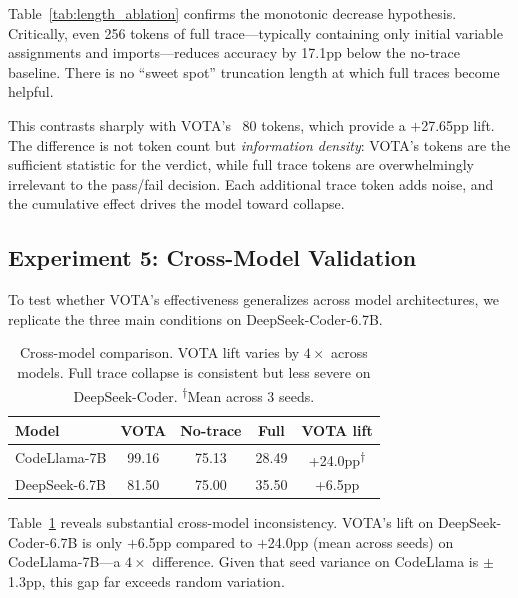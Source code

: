 \documentclass[11pt,a4paper]{article}
\begin{document}
Table~\ref{tab:length_ablation} confirms the monotonic decrease hypothesis. Critically, even 256 tokens of full trace---typically containing only initial variable assignments and imports---reduces accuracy by 17.1pp below the no-trace baseline. There is no ``sweet spot'' truncation length at which full traces become helpful.

This contrasts sharply with VOTA's ~80 tokens, which provide a $+$27.65pp lift. The difference is not token count but \emph{information density}: VOTA's tokens are the sufficient statistic for the verdict, while full trace tokens are overwhelmingly irrelevant to the pass/fail decision. Each additional trace token adds noise, and the cumulative effect drives the model toward collapse.

\subsection{Experiment 5: Cross-Model Validation}
\label{sec:exp5}

To test whether VOTA's effectiveness generalizes across model architectures, we replicate the three main conditions on DeepSeek-Coder-6.7B.

\begin{table}[t]
\centering
\small
\begin{tabular}{lcccc}
\toprule
\textbf{Model} & \textbf{VOTA} & \textbf{No-trace} & \textbf{Full} & \textbf{VOTA lift} \\
\midrule
CodeLlama-7B & 99.16 & 75.13 & 28.49 & +24.0pp\textsuperscript{$\dagger$} \\
DeepSeek-6.7B & 81.50 & 75.00 & 35.50 & +6.5pp \\
\bottomrule
\end{tabular}
\caption{Cross-model comparison. VOTA lift varies by $4\times$ across models. Full trace collapse is consistent but less severe on DeepSeek-Coder. \textsuperscript{$\dagger$}Mean across 3 seeds.}
\label{tab:cross_model}
\end{table}

Table~\ref{tab:cross_model} reveals substantial cross-model inconsistency. VOTA's lift on DeepSeek-Coder-6.7B is only $+$6.5pp compared to $+$24.0pp (mean across seeds) on CodeLlama-7B---a $4\times$ difference. Given that seed variance on CodeLlama is $\pm$1.3pp, this gap far exceeds random variation.
\end{document}
